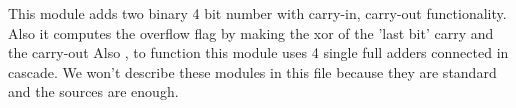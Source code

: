 This module adds two binary 4 bit number with carry-in, carry-out functionality. Also it computes the overflow flag by making the xor of the 'last bit' carry and the carry-out
Also , to function this module uses 4 single full adders connected in 	
cascade. We won't describe these modules in this file because they are standard and the sources are enough.



